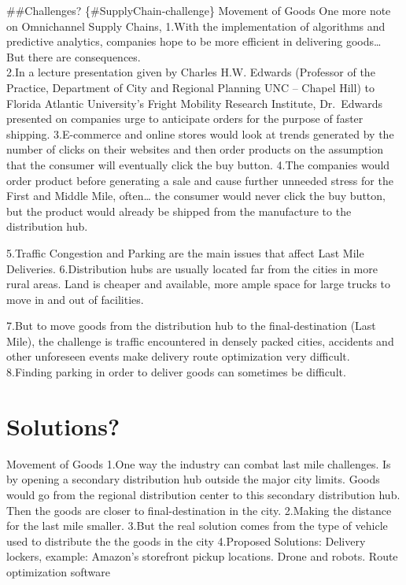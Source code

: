 \documentclass[
]{book}
\begin{document}
\#\#Challenges? \{\#SupplyChain-challenge\}
Movement of Goods
One more note on Omnichannel Supply Chains,
1.With the implementation of algorithms and predictive analytics, companies hope to be more efficient in delivering goods\ldots{} But there are consequences.\\
2.In a lecture presentation given by Charles H.W. Edwards (Professor of the Practice, Department of City and Regional Planning UNC -- Chapel Hill) to Florida Atlantic University's Fright Mobility Research Institute, Dr.~Edwards presented on companies urge to anticipate orders for the purpose of faster shipping.
3.E-commerce and online stores would look at trends generated by the number of clicks on their websites and then order products on the assumption that the consumer will eventually click the buy button.
4.The companies would order product before generating a sale and cause further unneeded stress for the First and Middle Mile, often\ldots{} the consumer would never click the buy button, but the product would already be shipped from the manufacture to the distribution hub.

5.Traffic Congestion and Parking are the main issues that affect Last Mile Deliveries.
6.Distribution hubs are usually located far from the cities in more rural areas.
Land is cheaper and available, more ample space for large trucks to move in and out of facilities.

7.But to move goods from the distribution hub to the final-destination (Last Mile), the challenge is traffic encountered in densely packed cities, accidents and other unforeseen events make delivery route optimization very difficult.\\
8.Finding parking in order to deliver goods can sometimes be difficult.

\hypertarget{SupplyChain-Soln}{%
\section{Solutions?}\label{SupplyChain-Soln}}

Movement of Goods
1.One way the industry can combat last mile challenges. Is by opening a secondary distribution hub outside the major city limits. Goods would go from the regional distribution center to this secondary distribution hub. Then the goods are closer to final-destination in the city.
2.Making the distance for the last mile smaller.
3.But the real solution comes from the type of vehicle used to distribute the the goods in the city
4.Proposed Solutions:
Delivery lockers, example: Amazon's storefront pickup locations.
Drone and robots.
Route optimization software
\end{document}
